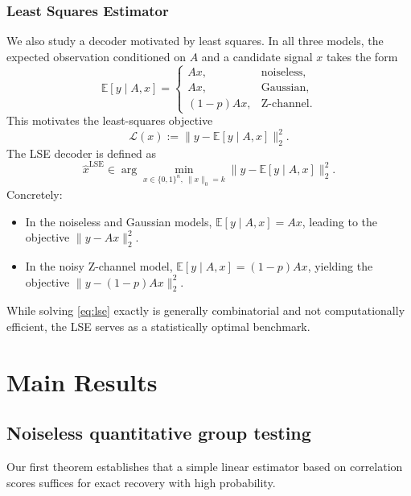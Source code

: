 \documentclass{article}
\newcommand{\E}{\mathbb{E}}
\begin{document}
\subsubsection{Least Squares Estimator}
We also study a decoder motivated by least squares.
In all three models, the expected observation conditioned on $A$ and a candidate signal $x$ takes the form
\[
\E[y \mid A, x] =
\begin{cases}
A x, & \text{noiseless},\\
A x, & \text{Gaussian},\\
(1-p) A x, & \text{Z-channel}.
\end{cases}
\]
This motivates the least-squares objective
\[
\mathcal{L}(x) := \|y - \E[y \mid A, x]\|_2^2.
\]
The LSE decoder is defined as
\begin{equation}
\widehat{x}^{\mathrm{LSE}}
\in
\arg\min_{x\in\{0,1\}^n,\ \|x\|_0 = k}
\|y - \E[y \mid A, x]\|_2^2.
\label{eq:lse}
\end{equation}
Concretely:
\begin{itemize}
\item In the noiseless and Gaussian models, $\E[y \mid A, x] = A x$, leading to the objective $\|y-Ax\|_2^2$.
\item In the noisy Z-channel model, $\E[y \mid A, x] = (1-p)Ax$, yielding the objective $\|y-(1-p)Ax\|_2^2$.
\end{itemize}
While solving \eqref{eq:lse} exactly is generally combinatorial and not computationally efficient, the LSE serves as a statistically optimal benchmark.



\section{Main Results}\label{sec:maintheorems}
\subsection{Noiseless quantitative group testing}
Our first theorem establishes that a simple linear estimator based on correlation scores suffices for exact recovery with high probability.
\end{document}
